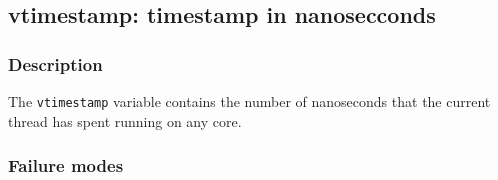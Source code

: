 \clearpage
{}
{}
\label{vars:vtimestamp}
\subsection*{vtimestamp: timestamp in nanosecconds}

\subsubsection*{Description}

The \verb|vtimestamp| variable contains the number of nanoseconds
that the current thread has spent running on any core.

\subsubsection*{Failure modes}

